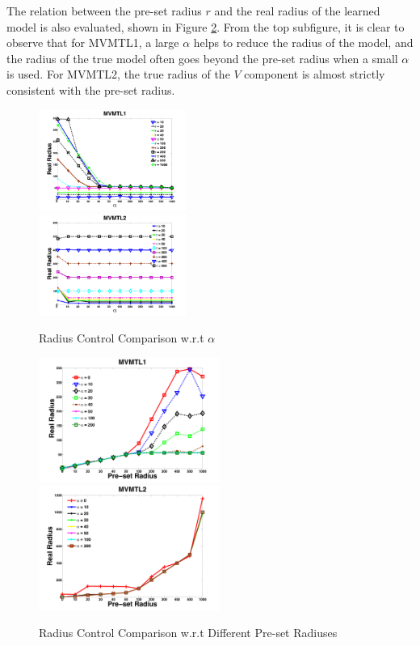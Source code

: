 \documentclass{article}
\begin{document}
The relation between the pre-set radius $r$ and the real radius of the learned model is also evaluated, shown in Figure \ref{fig:v-radius}. From the top subfigure, it is clear to observe that for MVMTL1, a large $\alpha$ helps to reduce the radius of the model, and the radius of the true model often goes beyond the pre-set radius when a small $\alpha$ is used. For MVMTL2, the true radius of the $V$ component is almost strictly consistent with the pre-set radius.  
%
%
\begin{figure}[h]
\centering
\begin{minipage}{1\textwidth}
\includegraphics[width= .5\textwidth, height=1.3in]{figures/alpha_mvmtl1.pdf}\\
\includegraphics[width= .5\textwidth, height=1.3in]{figures/alpha_mvmtl2.pdf}
\end{minipage}
\caption{Radius Control Comparison w.r.t $\alpha$}
\label{fig:v-alpha}
\end{figure}
\begin{figure}
\begin{center}
\begin{minipage}{1\textwidth}
\includegraphics[width= .25\textwidth, height=1.6in]{figures/radius_mvmtl1.pdf}
\includegraphics[width= .25\textwidth, height=1.6in]{figures/radius_mvmtl2.pdf}
\end{minipage}
\end{center}
\caption{Radius Control Comparison w.r.t Different Pre-set Radiuses}
\label{fig:v-radius}
\end{figure}
%
\end{document}
